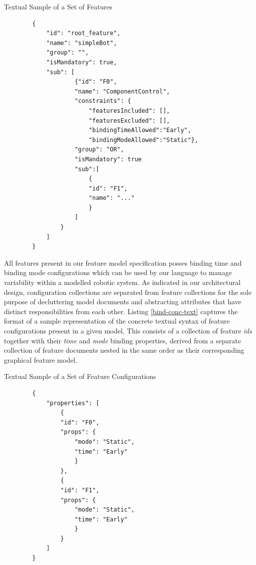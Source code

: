 \documentclass[conference]{IEEEtran}
\begin{document}
\begin{listing}[H]
\caption{Textual Sample of a Set of Features}
\begin{verbatim}
		{
		    "id": "root_feature",
		    "name": "simpleBot",
		    "group": "",
		    "isMandatory": true,
		    "sub": [
			        {"id": "F0",
			        "name": "ComponentControl",
			        "constraints": {
				        "featuresIncluded": [],
				        "featuresExcluded": [],
				        "bindingTimeAllowed":"Early",
				        "bindingModeAllowed":"Static"},
			        "group": "OR",
			        "isMandatory": true
			        "sub":[
			            {
			            "id": "F1",
			            "name": "..."
			            }
			        ]
		        }
		    ]
		}
\end{verbatim}
\label{feat-conc-text}
\end{listing}

All features present in our feature model specification posses binding time and binding mode configurations which can be used by our language to manage variability within a modelled robotic system. As indicated in our architectural design, configuration collections are separated from feature collections for the sole purpose of decluttering model documents and abstracting attributes that have distinct responsibilities from each other. Listing
\ref{bind-conc-text} captures the format of a sample representation of the concrete textual syntax of feature configurations present in a given model. This consists of a collection of feature \textit{ids} together with their \textit{time} and \textit{mode} binding properties, derived from a separate collection of feature documents nested in the same order as their corresponding graphical feature model.

\begin{listing}[H]
\caption{Textual Sample of a Set of Feature Configurations}
\begin{verbatim}
		{
			"properties": [
			    {
			    "id": "F0",
			    "props": {
			        "mode": "Static",
			        "time": "Early"
			    	}
			    },
			    {
			    "id": "F1",
			    "props": {
			        "mode": "Static",
			        "time": "Early"
			    	}
			    }
			]
		}
\end{verbatim}
\label{bind-conc-text}
\end{listing}
\end{document}
